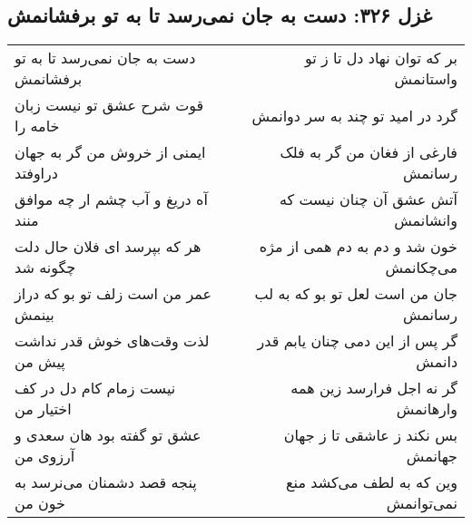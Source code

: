 \begin{center}
\section*{غزل ۳۲۶: دست به جان نمی‌رسد تا به تو برفشانمش}
\label{sec:326}
\begin{longtable}{l p{0.5cm} r}
دست به جان نمی‌رسد تا به تو برفشانمش
&&
بر که توان نهاد دل تا ز تو واستانمش
\\
قوت شرح عشق تو نیست زبان خامه را
&&
گرد در امید تو چند به سر دوانمش
\\
ایمنی از خروش من گر به جهان دراوفتد
&&
فارغی از فغان من گر به فلک رسانمش
\\
آه دریغ و آب چشم ار چه موافق منند
&&
آتش عشق آن چنان نیست که وانشانمش
\\
هر که بپرسد ای فلان حال دلت چگونه شد
&&
خون شد و دم به دم همی از مژه می‌چکانمش
\\
عمر من است زلف تو بو که دراز بینمش
&&
جان من است لعل تو بو که به لب رسانمش
\\
لذت وقت‌های خوش قدر نداشت پیش من
&&
گر پس از این دمی چنان یابم قدر دانمش
\\
نیست زمام کام دل در کف اختیار من
&&
گر نه اجل فرارسد زین همه وارهانمش
\\
عشق تو گفته بود هان سعدی و آرزوی من
&&
بس نکند ز عاشقی تا ز جهان جهانمش
\\
پنجه قصد دشمنان می‌نرسد به خون من
&&
وین که به لطف می‌کشد منع نمی‌توانمش
\\
\end{longtable}
\end{center}
